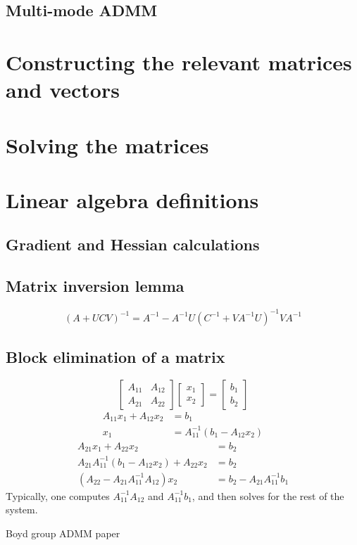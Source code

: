 \documentclass{article}
\begin{document}
\subsection{Multi-mode ADMM}
\begin{appendix}
\section{Constructing the relevant matrices and vectors}
\section{Solving the matrices}
\section{Linear algebra definitions}
\subsection{Gradient and Hessian calculations}
\subsection{Matrix inversion lemma}\label{inv lemma}
\begin{equation}
(A + UCV)^{-1} = A^{-1} - A^{-1}U (C^{-1} + V A^{-1} U)^{-1} V A^{-1}
\end{equation}
\subsection{Block elimination of a matrix}\label{block elim}
\begin{equation}
\begin{bmatrix} A_{11} & A_{12} \\ A_{21} & A_{22} \end{bmatrix} 
\begin{bmatrix} x_1 \\ x_2 \end{bmatrix} = 
\begin{bmatrix} b_1 \\ b_2 \end{bmatrix}
\end{equation}
\begin{subequations}\begin{align}
A_{11} x_1 + A_{12} x_2 &= b_1 \\
x_1 &= A_{11}^{-1} (b_1 - A_{12} x_2)
\end{align}\end{subequations}
\begin{subequations}\begin{align}
A_{21} x_1 + A_{22} x_2 &= b_2 \\
A_{21} A_{11}^{-1} (b_1 - A_{12} x_2) + A_{22} x_2 &= b_2 \\
(A_{22} - A_{21} A_{11}^{-1} A_{12}) x_2 &= b_2 - A_{21} A_{11}^{-1} b_1
\end{align}\end{subequations}
Typically, one computes $A_{11}^{-1} A_{12}$ and $A_{11}^{-1} b_1$, 
    and then solves for the rest of the system.
\end{appendix}
\begin{thebibliography}{99}
 Boyd group ADMM paper
\end{thebibliography}
\end{document}
